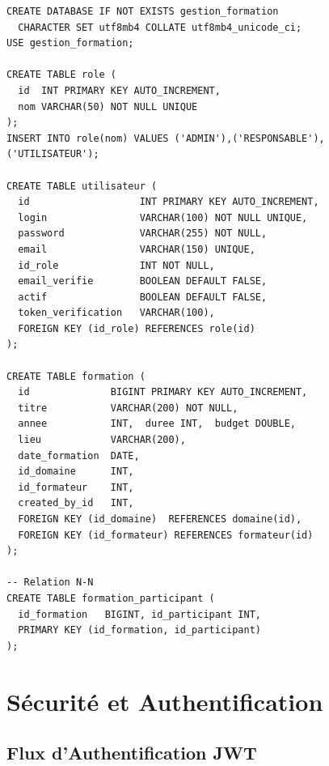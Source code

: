 \documentclass[12pt,a4paper]{report}
\begin{document}
\begin{lstlisting}[style=sqlstyle, caption={Extrait du script schema.sql}]
CREATE DATABASE IF NOT EXISTS gestion_formation
  CHARACTER SET utf8mb4 COLLATE utf8mb4_unicode_ci;
USE gestion_formation;

CREATE TABLE role (
  id  INT PRIMARY KEY AUTO_INCREMENT,
  nom VARCHAR(50) NOT NULL UNIQUE
);
INSERT INTO role(nom) VALUES ('ADMIN'),('RESPONSABLE'),('UTILISATEUR');

CREATE TABLE utilisateur (
  id                   INT PRIMARY KEY AUTO_INCREMENT,
  login                VARCHAR(100) NOT NULL UNIQUE,
  password             VARCHAR(255) NOT NULL,
  email                VARCHAR(150) UNIQUE,
  id_role              INT NOT NULL,
  email_verifie        BOOLEAN DEFAULT FALSE,
  actif                BOOLEAN DEFAULT FALSE,
  token_verification   VARCHAR(100),
  FOREIGN KEY (id_role) REFERENCES role(id)
);

CREATE TABLE formation (
  id              BIGINT PRIMARY KEY AUTO_INCREMENT,
  titre           VARCHAR(200) NOT NULL,
  annee           INT,  duree INT,  budget DOUBLE,
  lieu            VARCHAR(200),
  date_formation  DATE,
  id_domaine      INT,
  id_formateur    INT,
  created_by_id   INT,
  FOREIGN KEY (id_domaine)  REFERENCES domaine(id),
  FOREIGN KEY (id_formateur) REFERENCES formateur(id)
);

-- Relation N-N
CREATE TABLE formation_participant (
  id_formation   BIGINT, id_participant INT,
  PRIMARY KEY (id_formation, id_participant)
);
\end{lstlisting}

\clearpage
\chapter{S\'{e}curit\'{e} et Authentification}

\section{Flux d'Authentification JWT}
\end{document}
